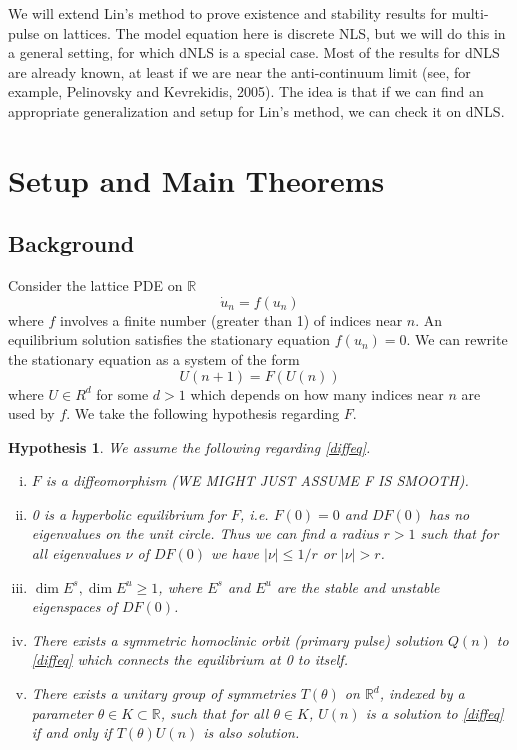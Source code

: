 \documentclass[12pt]{article}
\def\R{{\mathbb R}}
\newtheorem{hypothesis}{Hypothesis}
\begin{document}
We will extend Lin's method to prove existence and stability results for multi-pulse on lattices. The model equation here is discrete NLS, but we will do this in a general setting, for which dNLS is a special case. Most of the results for dNLS are already known, at least if we are near the anti-continuum limit (see, for example, Pelinovsky and Kevrekidis, 2005). The idea is that if we can find an appropriate generalization and setup for Lin's method, we can check it on dNLS. 

\section{Setup and Main Theorems}

\subsection{Background}
Consider the lattice PDE on $\R$
\begin{equation}\label{latticePDE}
\dot{u}_n = f(u_n)
\end{equation}
where $f$ involves a finite number (greater than 1) of indices near $n$. An equilibrium solution satisfies the stationary equation $f(u_n) = 0$. We can rewrite the stationary equation as a system of the form
\begin{equation}\label{diffeq}
U(n+1) = F(U(n))
\end{equation}
where $U \in R^d$ for some $d > 1$ which depends on how many indices near $n$ are used by $f$. We take the following hypothesis regarding $F$.
\begin{hypothesis}\label{initialhyp}
We assume the following regarding \eqref{diffeq}.
\begin{enumerate}[(i)]
\item $F$ is a diffeomorphism (WE MIGHT JUST ASSUME F IS SMOOTH).
\item 0 is a hyperbolic equilibrium for $F$, i.e. $F(0) = 0$ and $DF(0)$ has no eigenvalues on the unit circle. Thus we can find a radius $r > 1$ such that for all eigenvalues $\nu$ of $DF(0)$ we have $|\nu| \leq 1/r$ or $|\nu| > r$.
\item $\dim E^s, \dim E^u \geq 1$, where $E^s$ and $E^u$ are the stable and unstable eigenspaces of $DF(0)$.
\item There exists a symmetric homoclinic orbit (primary pulse) solution $Q(n)$ to \eqref{diffeq} which connects the equilibrium at 0 to itself.
\item There exists a unitary group of symmetries $T(\theta)$ on $\R^d$, indexed by a parameter $\theta \in K \subset \R$, such that for all $\theta \in K$, $U(n)$ is a solution to \eqref{diffeq} if and only if $T(\theta)U(n)$ is also solution. 
\end{enumerate}
\end{hypothesis}
\end{document}
